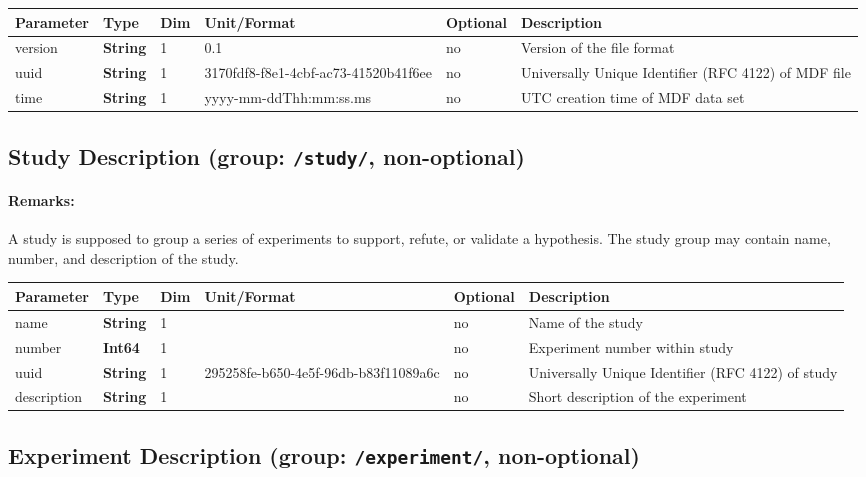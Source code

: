 \documentclass[landscape,a4paper]{article} %
\newcommand{\inl}[1]{\lstinline[columns=fixed]{#1}}
\newcommand{\inltab}[1]{{\ttfamily\bfseries\color{blue}#1}}
\newcommand{\inlvar}[1]{{\ttfamily#1}}
\begin{document}
\noindent \begin{tabularx}{\columnwidth}{lllllX} 
\textbf{Parameter} & \textbf{Type} & \textbf{Dim} & \textbf{Unit/Format} & \textbf{Optional} & \textbf{Description} \\ \hline 
\inlvar{version} & \inltab{String} & 1 & 0.1 & no & Version of the file format \\ \hline
\inlvar{uuid} & \inltab{String} & 1 & 3170fdf8-f8e1-4cbf-ac73-41520b41f6ee & no & Universally Unique Identifier (RFC 4122) of MDF file \\ \hline 
\inlvar{time} & \inltab{String} & 1 & yyyy-mm-ddThh:mm:ss.ms & no & UTC creation time of MDF data set \\ \hline
\end{tabularx}


\subsection{Study Description (group: \inl{/study/}, non-optional)}

\begin{multicols}{2}
	\paragraph{Remarks:} A study is supposed to group a series of experiments to support, refute, or validate a hypothesis. The study group may contain \inlvar{name}, \inlvar{number}, and \inlvar{description} of the study.
\end{multicols}

\noindent \begin{tabularx}{\columnwidth}{lllllX} 
\textbf{Parameter} & \textbf{Type} & \textbf{Dim} & \textbf{Unit/Format} & \textbf{Optional} & \textbf{Description} \\ \hline 
\inlvar{name} & \inltab{String} & 1 & & no & Name of the study \\ \hline
\inlvar{number} & \inltab{Int64} & 1 & & no & Experiment number within study \\ \hline
\inlvar{uuid} & \inltab{String} & 1 & 295258fe-b650-4e5f-96db-b83f11089a6c & no & Universally Unique Identifier (RFC 4122) of study \\ \hline 
\inlvar{description} & \inltab{String} & 1 & & no & Short description of the experiment \\ \hline
\end{tabularx}


\subsection{Experiment Description (group: \inl{/experiment/}, non-optional)}
\end{document}
